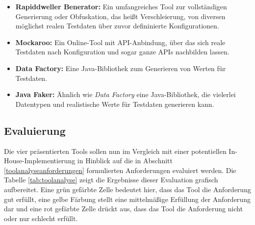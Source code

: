 \begin{itemize}
    \item \textbf{Rapiddweller Benerator:} Ein umfangreiches Tool zur vollständigen Generierung oder Obfuskation, das heißt Verschleierung, von diversen möglichst realen Testdaten über zuvor defininierte Konfigurationen. \cite{benerator:2022}
    \item \textbf{Mockaroo:} Ein Online-Tool mit \ac{API}-Anbindung, über das sich reale Testdaten nach Konfiguration und sogar ganze \ac{API}s nachbilden lassen. \cite{mockaroo:2022}
    \item \textbf{Data Factory:} Eine Java-Bibliothek zum Generieren von Werten für Testdaten. \cite{datafactory:2022}
    \item \textbf{Java Faker:} Ähnlich wie \textit{Data Factory} eine Java-Bibliothek, die vielerlei Datentypen und realistische Werte für Testdaten generieren kann. \cite{javafaker:2022}
\end{itemize}

\subsection{Evaluierung}\label{toolanalysevaluierung}
Die vier präsentierten Tools sollen nun im Vergleich mit einer potentiellen In-House-Implementierung in Hinblick auf die in Abschnitt \ref{toolanalyseanforderungen} formulierten Anforderungen evaluiert werden. Die Tabelle \ref{tab:toolanalyse} zeigt die Ergebnisse dieser Evaluation grafisch aufbereitet. Eine grün gefärbte Zelle bedeutet hier, dass das Tool die Anforderung gut erfüllt, eine gelbe Färbung stellt eine mittelmäßige Erfüllung der Anforderung dar und eine rot gefärbte Zelle drückt aus, dass das Tool die Anforderung nicht oder nur schlecht erfüllt.


